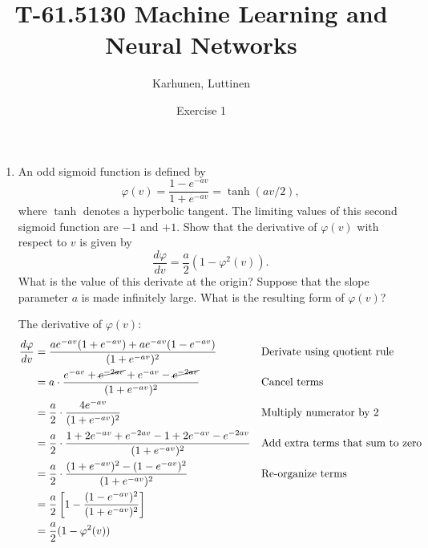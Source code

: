 
\title{T-61.5130 Machine Learning and Neural Networks}
\author{Karhunen, Luttinen}
\date{Exercise 1}

\newcommand{\vect}[1]{{\bf{#1}}}
\newcommand{\svect}[1]{\boldsymbol{#1}}
\newcommand{\matr}[1]{\boldsymbol{#1}}

\usepackage{cancel}
\usepackage{mathtools}



\maketitle 
\thispagestyle{empty}

\begin{enumerate}

\item

  An odd sigmoid function is defined by
  \begin{equation}
    \label{eq:sigmoid}
    \varphi(v)=\frac{1-e^{-av}}{1+e^{-av}}=\tanh(av/2),
  \end{equation}
  where $\tanh$ denotes a hyperbolic tangent. The limiting values of
  this second sigmoid function are $-1$ and $+1$. Show that the
  derivative of $\varphi(v)$ with respect to $v$ is given by
  \begin{equation*}
    \frac{d\varphi}{dv}=\frac{a}{2}(1-\varphi^2(v)).
  \end{equation*}
  What is the value of this derivate at the origin? Suppose that the
  slope parameter $a$ is made infinitely large. What is the resulting
  form of $\varphi(v)$?  
  
  \begin{solution}

    The derivative of $\varphi(v)$:
    \begin{align*}
      \frac{d\varphi}{dv} &= \frac{a e^{-av} (1 + e^{-av}) + a
        e^{-av} (1 - e^{-av})} {(1+e^{-av})^2}
      && \text{Derivate using quotient rule}
      \\
      &= a \cdot \frac{ e^{-av} + \cancel{e^{-2av}} + e^{-av} -
        \cancel{e^{-2av}}} {(1 + e^{-av})^2}
      && \text{Cancel terms}
      \\
      &= \frac{a}{2} \cdot \frac{4 e^{-av}} {(1+e^{-av})^2} &&
      \text{Multiply numerator by 2}
      \\
      &= \frac{a}{2} \cdot \frac{1+2e^{-av}+e^{-2av} -
        1+2e^{-av}-e^{-2av}} {(1+e^{-av})^2} && \text{Add extra
        terms that sum to zero}
      \\
      &= \frac{a}{2} \cdot \frac{(1+e^{-av})^2 - (1-e^{-av})^2}
      {(1+e^{-av})^2} && \text{Re-organize terms}
      \\
      &= \frac{a}{2} \left[ 1 - \frac{(1-e^{-av})^2} {(1+e^{-av})^2}
      \right]
      \\
      &= \frac{a}{2} ( 1 - \varphi^2(v) )
    \end{align*}


\end{solution}
\end{enumerate}
